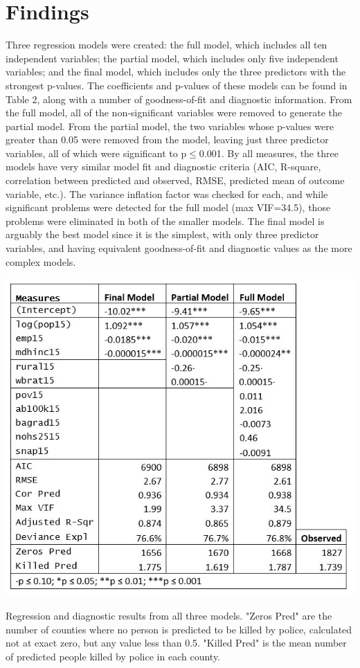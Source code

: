 \documentclass[sigconf]{acmart}
\begin{document}
\section{Findings}
Three regression models were created: the full model, which includes all ten independent variables; the partial model, which includes only five independent variables; and the final model, which includes only the three predictors with the strongest p-values.  The coefficients and p-values of these models can be found in Table 2, along with a number of goodness-of-fit and diagnostic information.  From the full model, all of the non-significant variables were removed to generate the partial model.  From the partial model, the two variables whose p-values were greater than 0.05 were removed from the model, leaving just three predictor variables, all of which were significant to p$\leq$0.001. \cite{beaujean16} By all measures, the three models have very similar model fit and diagnostic criteria (AIC, R-square, correlation between predicted and observed, RMSE, predicted mean of outcome variable, etc.).  The variance inflation factor was checked for each, and while significant problems were detected for the full model (max VIF=34.5), those problems were eliminated in both of the smaller models.  The final model is arguably the best model since it is the simplest, with only three predictor variables, and having equivalent goodness-of-fit and diagnostic values as the more complex models. 

\begin{table}
\includegraphics[width=1.0\textwidth]{images/table2.jpg}
\caption{Regression and diagnostic results from all three models.  "Zeros Pred" are the number of counties where no person is predicted to be killed by police, calculated not at exact zero, but any value less than 0.5.  "Killed Pred" is the mean number of predicted people killed by police in each county.}
\end{table}
\end{document}

